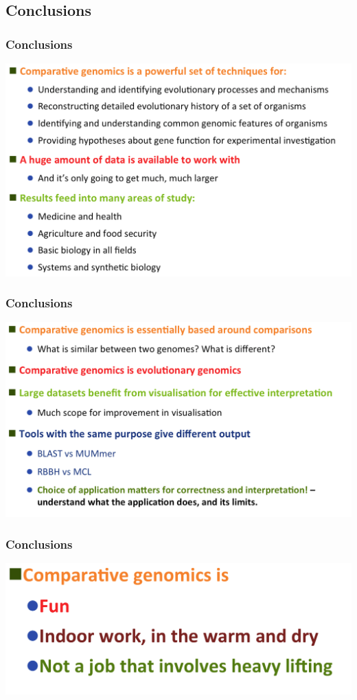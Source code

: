 
\subsection{Conclusions}

\begin{frame}
  \frametitle{Conclusions}
  \begin{center}
      \includegraphics[width=1\textwidth]{images/conclusions1} 
  \end{center}
\end{frame}

\begin{frame}
  \frametitle{Conclusions}
  \begin{center}
      \includegraphics[width=1\textwidth]{images/conclusions2} 
  \end{center}
\end{frame}

\begin{frame}
  \frametitle{Conclusions}
  \begin{center}
      \includegraphics[width=1\textwidth]{images/conclusions3} 
  \end{center}
\end{frame}